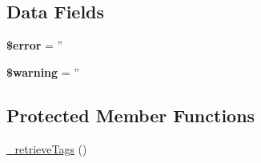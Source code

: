 \subsection*{Data Fields}
\begin{DoxyCompactItemize}
\item 
\hypertarget{classbbcode__parent__class_aeba2ab722cedda53dbb7ec1a59f45550}{{\bfseries \$error} = ''}\label{classbbcode__parent__class_aeba2ab722cedda53dbb7ec1a59f45550}

\item 
\hypertarget{classbbcode__parent__class_a39415d3b695b34f34c5693c1828d803a}{{\bfseries \$warning} = ''}\label{classbbcode__parent__class_a39415d3b695b34f34c5693c1828d803a}

\end{DoxyCompactItemize}
\subsection*{Protected Member Functions}
\begin{DoxyCompactItemize}
\item 
\hyperlink{classbbcode__parent__class_ada1b662991b6f68ff54f9f1e527bbe43}{\-\_\-retrieve\-Tags} ()
\end{DoxyCompactItemize}
